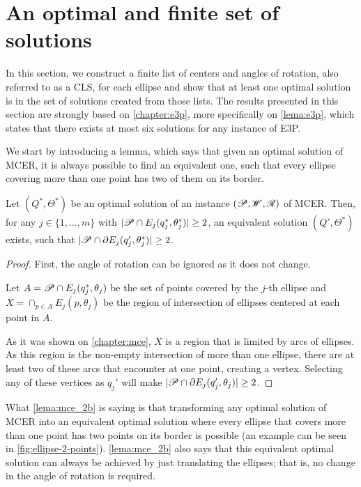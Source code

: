 \section{An optimal and finite set of solutions}

In this section, we construct a finite list of centers and angles of rotation, also referred to as a CLS, for each ellipse and show that at least one optimal solution is in the set of solutions created from those lists. The results presented in this section are strongly based on \autoref{chapter:e3p}, more specifically on \autoref{lema:e3p}, which states that there exists at most six solutions for any instance of E3P.

We start by introducing a lemma, which says that given an optimal solution of MCER, it is always possible to find an equivalent one, such that every ellipse covering more than one point has two of them on its border.

\begin{lema}\label{lema:mce_2b}
	Let $(Q^*, \Theta^*)$ be an optimal solution of an instance $(\mathscr{P}, \mathscr{W}, \mathscr{R})$ of MCER. 
	Then, for any $j\in\{1, \dots, m\}$ with $|\mathscr{P} \cap E_j(q_j^*, \theta_j^*)|\ge2$, 
	an equivalent solution $(Q', \Theta^*)$ exists, such that $|\mathscr{P} \cap \partial E_j(q_j', \theta_j^*)|\ge 2$.
\end{lema}

\begin{proof}
	First, the angle of rotation can be ignored as it does not change.
	
	Let $A=\mathscr{P} \cap E_j(q_j^*, \theta_j)$ be the set of points covered by the $j$-th ellipse and $X=\cap_{p \in A}E_j(p, \theta_j)$ be the region of intersection of ellipses centered at each point in $A$.

	As it was shown on \autoref{chapter:mce}, $X$ is a region that is limited by arcs of ellipses. As this region is the non-empty intersection of more than one ellipse, there are at least two of these arcs that encounter at one point, creating a vertex. Selecting any of these vertices as $q_j'$ will make $|\mathscr{P} \cap \partial E_j(q_j', \theta_j)| \ge 2$.
	
\end{proof}

What \autoref{lema:mce_2b} is saying is that transforming any optimal solution of MCER into an equivalent optimal solution where every ellipse that covers more than one point has two points on its border is possible (an example can be seen in \autoref{fig:ellipse-2-points}). \autoref{lema:mce_2b} also says that this equivalent optimal solution can always be achieved by just translating the ellipses; that is, no change in the angle of rotation is required. 

